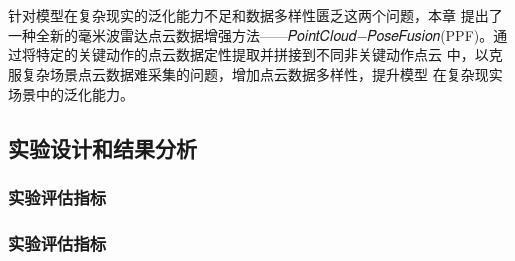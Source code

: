\chapter{}
针对模型在复杂现实的泛化能力不足和数据多样性匮乏这两个问题，本章
提出了一种全新的毫米波雷达点云数据增强方法——𝑃𝑜𝑖𝑛𝑡𝐶𝑙𝑜𝑢𝑑−𝑃𝑜𝑠𝑒𝐹𝑢𝑠𝑖𝑜𝑛(PPF)。通过将特定的关键动作的点云数据定性提取并拼接到不同非关键动作点云
中，以克服复杂场景点云数据难采集的问题，增加点云数据多样性，提升模型
在复杂现实场景中的泛化能力。

\section{实验设计和结果分析}
\subsection{实验评估指标}
\subsection{实验评估指标}
